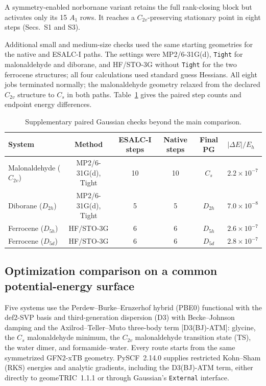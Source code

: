 \documentclass[10pt]{article}
\begin{document}
{A symmetry-enabled norbornane variant retains the full rank-closing block but
activates only its 15 \(A_1\) rows.  It reaches a \(C_{2v}\)-preserving stationary
point in eight steps (Secs.~S1 and S3).

Additional small and medium-size checks used the same starting geometries for
the native and ESALC-I paths.  The settings were MP2/6-31G(d), \texttt{Tight}
for malonaldehyde and diborane, and HF/STO-3G without \texttt{Tight} for the
two ferrocene structures; all four calculations used standard guess Hessians.
All eight jobs terminated normally; the malonaldehyde geometry relaxed from
the declared \(C_{2v}\) structure to \(C_s\) in both paths.
{Table~\ref{tab:additional-gaussian-checks} gives the paired
step counts and endpoint energy differences.}

\begin{table}[htbp]
\centering
\caption{Supplementary paired Gaussian checks beyond the main comparison.}
\label{tab:additional-gaussian-checks}
\begin{tabular}{lccccl}
\toprule
System & Method & ESALC-I steps & Native steps & Final PG & $|\Delta E|/E_h$ \\
\midrule
Malonaldehyde ($C_{2v}$) & MP2/6-31G(d), Tight & 10 & 10 & $C_s$ & $2.2\times10^{-7}$ \\
Diborane ($D_{2h}$) & MP2/6-31G(d), Tight & 5 & 5 & $D_{2h}$ & $7.0\times10^{-8}$ \\
Ferrocene ($D_{5h}$) & HF/STO-3G & 6 & 6 & $D_{5h}$ & $2.6\times10^{-7}$ \\
Ferrocene ($D_{5d}$) & HF/STO-3G & 6 & 6 & $D_{5d}$ & $2.8\times10^{-7}$ \\
\bottomrule
\end{tabular}
\end{table}

\subsection{Optimization comparison on a common potential-energy surface}

{Five systems use the Perdew--Burke--Ernzerhof hybrid (PBE0)
functional\cite{AdamoBarone1999PBE0} with the def2-SVP basis\cite{WeigendAhlrichs2005Def2} and third-generation dispersion
(D3) with Becke--Johnson damping\cite{GrimmeEhrlichGoerigk2011D3BJ} and the
Axilrod--Teller--Muto three-body term [D3(BJ)-ATM]:}
glycine, the \(C_s\) malonaldehyde minimum, the \(C_{2v}\) malonaldehyde
{transition state (TS)}, the water dimer, and formamide--water.  Every route starts from
the same symmetrized GFN2-xTB geometry.  PySCF~2.14.0 supplies {restricted
Kohn--Sham (RKS)} energies and
analytic gradients, including the D3(BJ)-ATM term, either directly to
geomeTRIC~1.1.1 or through Gaussian's \texttt{External} interface.

}
\end{document}
